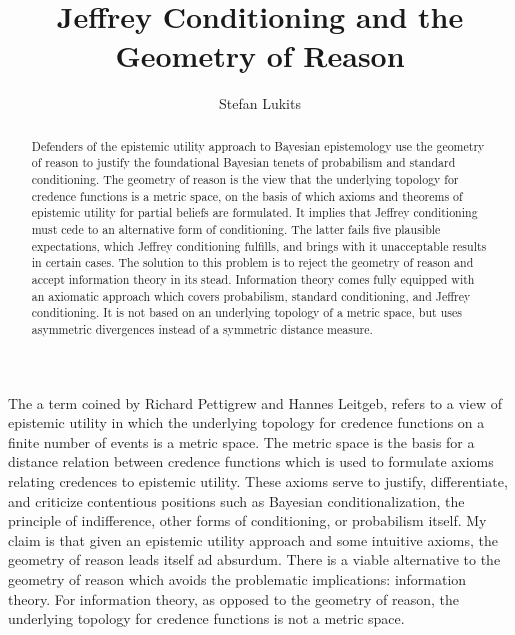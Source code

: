 \documentclass[11pt]{article} \usepackage{october}
\begin{document}
\onehalfspacing


\title{Jeffrey Conditioning and the Geometry of Reason}
\author{Stefan Lukits} 
\date{}
\maketitle
{}

\begin{abstract}
  {\noindent}Defenders of the epistemic utility approach to Bayesian
  epistemology use the geometry of reason to justify the foundational
  Bayesian tenets of probabilism and standard conditioning. The
  geometry of reason is the view that the underlying topology for
  credence functions is a metric space, on the basis of which axioms
  and theorems of epistemic utility for partial beliefs are
  formulated. It implies that Jeffrey conditioning must cede to an
  alternative form of conditioning. The latter fails five plausible
  expectations, which Jeffrey conditioning fulfills, and brings with
  it unacceptable results in certain cases. The solution to this
  problem is to reject the geometry of reason and accept information
  theory in its stead. Information theory comes fully equipped with an
  axiomatic approach which covers probabilism, standard conditioning,
  and Jeffrey conditioning. It is not based on an underlying topology
  of a metric space, but uses asymmetric divergences instead of a
  symmetric distance measure.
\end{abstract}

The  a term coined by Richard Pettigrew and
Hannes Leitgeb, refers to a view of epistemic utility in which the
underlying topology for credence functions on a finite number of
events is a metric space. The metric space is the basis for a distance
relation between credence functions which is used to formulate axioms
relating credences to epistemic utility. These axioms serve to
justify, differentiate, and criticize contentious positions such as
Bayesian conditionalization, the principle of indifference, other
forms of conditioning, or probabilism itself. My claim is that given
an epistemic utility approach and some intuitive axioms, the geometry
of reason leads itself ad absurdum. There is a viable alternative to
the geometry of reason which avoids the problematic implications:
information theory. For information theory, as opposed to the geometry
of reason, the underlying topology for credence functions is not a
metric space.
\end{document}

